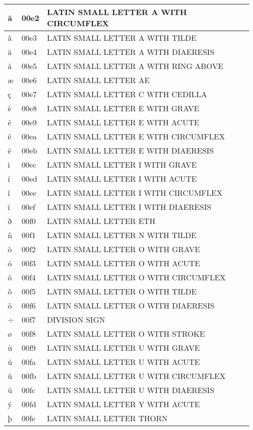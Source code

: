 \documentclass[12pt,letterpaper,openany]{book}
\begin{document}
\begin{center}
\begin{supertabular}{|m{0.25in}|m{0.5in}|m{4in}|}
â & 00e2 & LATIN SMALL LETTER A WITH CIRCUMFLEX\\\hline
ã & 00e3 & LATIN SMALL LETTER A WITH TILDE\\\hline
ä & 00e4 & LATIN SMALL LETTER A WITH DIAERESIS\\\hline
å & 00e5 & LATIN SMALL LETTER A WITH RING ABOVE\\\hline
æ & 00e6 & LATIN SMALL LETTER AE\\\hline
ç & 00e7 & LATIN SMALL LETTER C WITH CEDILLA\\\hline
è & 00e8 & LATIN SMALL LETTER E WITH GRAVE\\\hline
é & 00e9 & LATIN SMALL LETTER E WITH ACUTE\\\hline
ê & 00ea & LATIN SMALL LETTER E WITH CIRCUMFLEX\\\hline
ë & 00eb & LATIN SMALL LETTER E WITH DIAERESIS\\\hline
ì & 00ec & LATIN SMALL LETTER I WITH GRAVE\\\hline
í & 00ed & LATIN SMALL LETTER I WITH ACUTE\\\hline
î & 00ee & LATIN SMALL LETTER I WITH CIRCUMFLEX\\\hline
ï & 00ef & LATIN SMALL LETTER I WITH DIAERESIS\\\hline
ð & 00f0 & LATIN SMALL LETTER ETH\\\hline
ñ & 00f1 & LATIN SMALL LETTER N WITH TILDE\\\hline
ò & 00f2 & LATIN SMALL LETTER O WITH GRAVE\\\hline
ó & 00f3 & LATIN SMALL LETTER O WITH ACUTE\\\hline
ô & 00f4 & LATIN SMALL LETTER O WITH CIRCUMFLEX\\\hline
õ & 00f5 & LATIN SMALL LETTER O WITH TILDE\\\hline
ö & 00f6 & LATIN SMALL LETTER O WITH DIAERESIS\\\hline
÷ & 00f7 & DIVISION SIGN\\\hline
ø & 00f8 & LATIN SMALL LETTER O WITH STROKE\\\hline
ù & 00f9 & LATIN SMALL LETTER U WITH GRAVE\\\hline
ú & 00fa & LATIN SMALL LETTER U WITH ACUTE\\\hline
û & 00fb & LATIN SMALL LETTER U WITH CIRCUMFLEX\\\hline
ü & 00fc & LATIN SMALL LETTER U WITH DIAERESIS\\\hline
ý & 00fd & LATIN SMALL LETTER Y WITH ACUTE\\\hline
þ & 00fe & LATIN SMALL LETTER THORN\\\hline

\end{supertabular}
\end{center}
\end{document}
